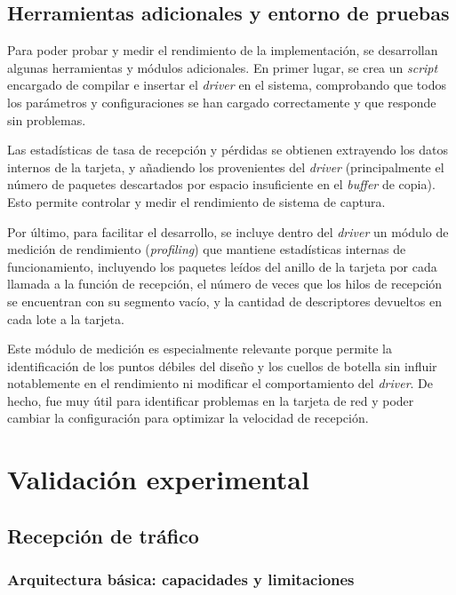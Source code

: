 \documentclass[oneside, draft]{epstfg}
\begin{document}
\section{Herramientas adicionales y entorno de pruebas}

Para poder probar y medir el rendimiento de la implementación, se desarrollan algunas herramientas y módulos adicionales. En primer lugar, se crea un \textit{script} encargado de compilar e insertar el \textit{driver} en el sistema, comprobando que todos los parámetros y configuraciones se han cargado correctamente y que responde sin problemas.

Las estadísticas de tasa de recepción y pérdidas se obtienen extrayendo los datos internos de la tarjeta, y añadiendo los provenientes del \textit{driver} (principalmente el número de paquetes descartados por espacio insuficiente en el \textit{buffer} de copia). Esto permite controlar y medir el rendimiento de sistema de captura.

Por último, para facilitar el desarrollo, se incluye dentro del \textit{driver} un módulo de medición de rendimiento (\textit{profiling}) que mantiene estadísticas internas de funcionamiento, incluyendo los paquetes leídos del anillo de la tarjeta por cada llamada a la función de recepción, el número de veces que los hilos de recepción se encuentran con su segmento vacío, y la cantidad de descriptores devueltos en cada lote a la tarjeta.

Este módulo de medición es especialmente relevante porque permite la identificación de los puntos débiles del diseño y los cuellos de botella sin influir notablemente en el rendimiento ni modificar el comportamiento del \textit{driver}. De hecho, fue muy útil para identificar problemas en la tarjeta de red y poder cambiar la configuración para optimizar la velocidad de recepción.

\chapter{Validación experimental}

\section{Recepción de tráfico}

\subsection{Arquitectura básica: capacidades y limitaciones}
\end{document}
